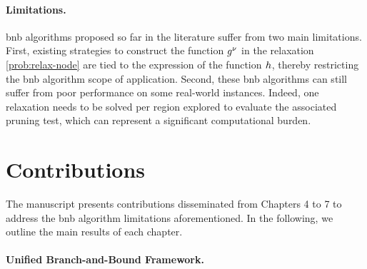 \documentclass[11pt]{article}
\begin{document}
\paragraph{Limitations.}
\gls{bnb} algorithms proposed so far in the literature suffer from two main limitations.
First, existing strategies to construct the function $g^\nu$ in the relaxation \eqref{prob:relax-node} are tied to the expression of the function $h$, thereby restricting the \gls{bnb} algorithm scope of application.
Second, these \gls{bnb} algorithms can still suffer from poor performance on some real-world instances.
Indeed, one relaxation needs to be solved per region explored to evaluate the associated pruning test, which can represent a significant computational burden.


\section{Contributions}
\label{sec:contributions}

The manuscript presents contributions disseminated from Chapters 4 to 7 to address the \gls{bnb} algorithm limitations aforementioned.
In the following, we outline the main results of each chapter.


\paragraph{Unified Branch-and-Bound Framework.}
\end{document}
